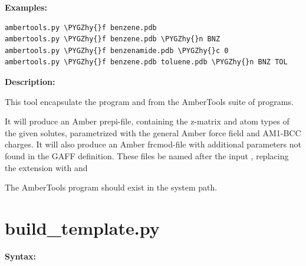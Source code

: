 \documentclass[letterpaper,10pt,english]{sphinxmanual}
\def\PYGZhy{\char`\-}
\begin{document}
\textbf{Examples:}

\begin{Verbatim}[frame=single,commandchars=\\\{\}]
ambertools.py \PYGZhy{}f benzene.pdb
ambertools.py \PYGZhy{}f benzene.pdb \PYGZhy{}n BNZ
ambertools.py \PYGZhy{}f benzenamide.pdb \PYGZhy{}c 0
ambertools.py \PYGZhy{}f benzene.pdb toluene.pdb \PYGZhy{}n BNZ TOL
\end{Verbatim}

\textbf{Description:}

This tool encapsulate the program  and  from the AmberTools suite of programs.

It will produce an Amber prepi-file, containing the z-matrix and atom types of the given solutes, parametrized with the general Amber force field and AM1-BCC charges. It will also produce an Amber frcmod-file with additional parameters not found in the GAFF definition. These files be named after the input , replacing the extension  with  and 

The AmberTools program should exist in the system path.


\section{build\_template.py}
\label{tools:build-template-py}
\textbf{Syntax:}
\end{document}
